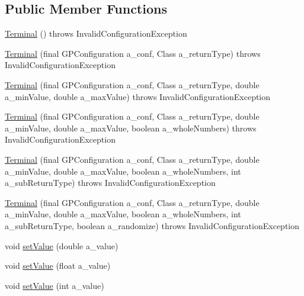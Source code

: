 \subsection*{Public Member Functions}
\begin{DoxyCompactItemize}
\item 
\hyperlink{classorg_1_1jgap_1_1gp_1_1terminal_1_1_terminal_a75790d1145b2d75dc1029b73fdfeb613}{Terminal} ()  throws Invalid\-Configuration\-Exception 
\item 
\hyperlink{classorg_1_1jgap_1_1gp_1_1terminal_1_1_terminal_a04749e72c441486b0acd56009d62bb09}{Terminal} (final G\-P\-Configuration a\-\_\-conf, Class a\-\_\-return\-Type)  throws Invalid\-Configuration\-Exception 
\item 
\hyperlink{classorg_1_1jgap_1_1gp_1_1terminal_1_1_terminal_a4fb01dad1477c21501fc9909ef879e27}{Terminal} (final G\-P\-Configuration a\-\_\-conf, Class a\-\_\-return\-Type, double a\-\_\-min\-Value, double a\-\_\-max\-Value)  throws Invalid\-Configuration\-Exception 
\item 
\hyperlink{classorg_1_1jgap_1_1gp_1_1terminal_1_1_terminal_a574a3f2e4d5e5fb7d4707a16c7557c46}{Terminal} (final G\-P\-Configuration a\-\_\-conf, Class a\-\_\-return\-Type, double a\-\_\-min\-Value, double a\-\_\-max\-Value, boolean a\-\_\-whole\-Numbers)  throws Invalid\-Configuration\-Exception 
\item 
\hyperlink{classorg_1_1jgap_1_1gp_1_1terminal_1_1_terminal_a1b3fcb9122d6921afae63998a87bf3ed}{Terminal} (final G\-P\-Configuration a\-\_\-conf, Class a\-\_\-return\-Type, double a\-\_\-min\-Value, double a\-\_\-max\-Value, boolean a\-\_\-whole\-Numbers, int a\-\_\-sub\-Return\-Type)  throws Invalid\-Configuration\-Exception 
\item 
\hyperlink{classorg_1_1jgap_1_1gp_1_1terminal_1_1_terminal_a48371857805c75b50c080ee399934d2b}{Terminal} (final G\-P\-Configuration a\-\_\-conf, Class a\-\_\-return\-Type, double a\-\_\-min\-Value, double a\-\_\-max\-Value, boolean a\-\_\-whole\-Numbers, int a\-\_\-sub\-Return\-Type, boolean a\-\_\-randomize)  throws Invalid\-Configuration\-Exception 
\item 
void \hyperlink{classorg_1_1jgap_1_1gp_1_1terminal_1_1_terminal_ae6e87fe3fd0f70163e07d3caabc7ff0a}{set\-Value} (double a\-\_\-value)
\item 
void \hyperlink{classorg_1_1jgap_1_1gp_1_1terminal_1_1_terminal_a3aadc112ea8b8ba489ef6affe4450c8e}{set\-Value} (float a\-\_\-value)
\item 
void \hyperlink{classorg_1_1jgap_1_1gp_1_1terminal_1_1_terminal_a09b99de1024fec6ca12cd210c09e5708}{set\-Value} (int a\-\_\-value)

\end{DoxyCompactItemize}
